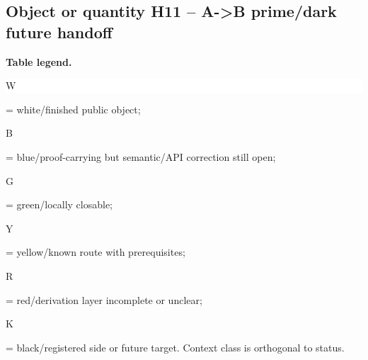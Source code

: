 \subsection*{Object or quantity H11 -- A->B prime/\allowbreak{}dark future handoff}
\hypertarget{objproof:H11}{}
\par\smallskip\noindent\begin{minipage}{0.99\linewidth}\footnotesize\raggedright\textbf{Table legend.} \colorbox{white}{\strut W} = white/finished public object; \colorbox{cyan!20}{\strut B} = blue/proof-carrying but semantic/API correction still open; \colorbox{green!18}{\strut G} = green/locally closable; \colorbox{yellow!25}{\strut Y} = yellow/known route with prerequisites; \colorbox{red!20}{\strut R} = red/derivation layer incomplete or unclear; \colorbox{black!18}{\strut K} = black/registered side or future target. Context class is orthogonal to status.\end{minipage}\par\vspace{0.25em}
